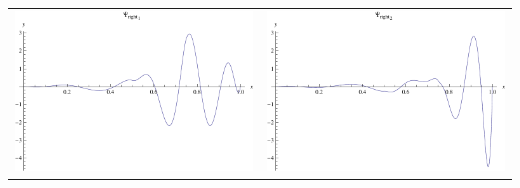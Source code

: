 \documentclass{article}
\begin{document}
\begin{landscape}
\begin{tabular}{cc}
\includegraphics[width=10.cm]{sextic_wavelet_dright_1.pdf}& \includegraphics[width=10.cm]{sextic_wavelet_dright_2.pdf} \\
\end{tabular} 
 \end{landscape}
\end{document}

